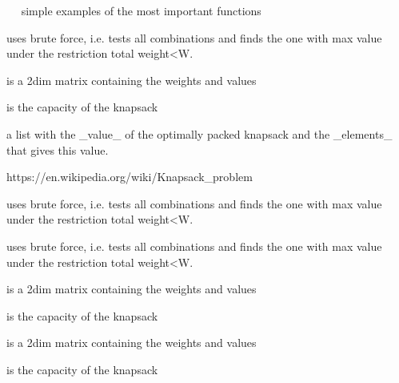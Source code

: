 \documentclass[a4paper]{book}
\begin{document}
%
\begin{Examples}
\begin{ExampleCode}
~~ simple examples of the most important functions ~~
\end{ExampleCode}
\end{Examples}
%
\begin{Description}\relax
uses brute force, i.e. tests all combinations and finds the one with max value under the restriction total weight<W.
\end{Description}
%
\begin{Arguments}
\begin{ldescription}
\item[\code{x}] is a 2dim matrix containing the weights and values

\item[\code{W}] is the capacity of the knapsack
\end{ldescription}
\end{Arguments}
%
\begin{Value}
a list with the \_value\_ of the optimally packed knapsack and the \_elements\_ that gives this value.
\end{Value}
%
\begin{References}\relax
https://en.wikipedia.org/wiki/Knapsack\_problem
\end{References}
%
\begin{Description}\relax
uses brute force, i.e. tests all combinations and finds the one with max value under the restriction total weight<W.

uses brute force, i.e. tests all combinations and finds the one with max value under the restriction total weight<W.
\end{Description}
%
\begin{Arguments}
\begin{ldescription}
\item[\code{x}] is a 2dim matrix containing the weights and values

\item[\code{W}] is the capacity of the knapsack

\item[\code{x}] is a 2dim matrix containing the weights and values

\item[\code{W}] is the capacity of the knapsack
\end{ldescription}
\end{Arguments}
\end{document}
